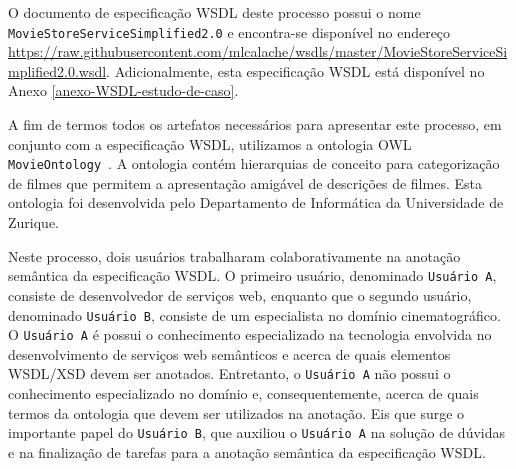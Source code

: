 O documento de especificação WSDL deste processo possui o nome \break\texttt{MovieStoreServiceSimplified2.0} e encontra-se disponível no endereço \url{https://raw.githubusercontent.com/mlcalache/wsdls/master/MovieStoreServiceSimplified2.0.wsdl}. Adicionalmente, esta especificação WSDL está disponível no Anexo \ref{anexo-WSDL-estudo-de-caso}.

A fim de termos todos os artefatos necessários para apresentar este processo, em conjunto com a especificação WSDL, utilizamos a ontologia OWL \texttt{MovieOntology}~\cite{MOVIEONTOLOGY-2019}. A ontologia contém hierarquias de conceito para categorização de filmes que permitem a apresentação amigável de descrições de filmes. Esta ontologia foi desenvolvida pelo Departamento de Informática da Universidade de Zurique.

Neste processo, dois usuários trabalharam colaborativamente na anotação semântica da especificação WSDL. O primeiro usuário, denominado \texttt{Usuário A}, consiste de desenvolvedor de serviços web, enquanto que o segundo usuário, denominado \texttt{Usuário B}, consiste de um especialista no domínio cinematográfico. O \texttt{Usuário A} é possui o conhecimento especializado na tecnologia envolvida no desenvolvimento de serviços web semânticos e acerca de quais elementos WSDL/XSD devem ser anotados. Entretanto, o \texttt{Usuário A} não possui o conhecimento especializado no domínio e, consequentemente, acerca de quais termos da ontologia que devem ser utilizados na anotação. Eis que surge o importante papel do \texttt{Usuário B}, que auxiliou o \texttt{Usuário A} na solução de dúvidas e na finalização de tarefas para a anotação semântica da especificação WSDL.